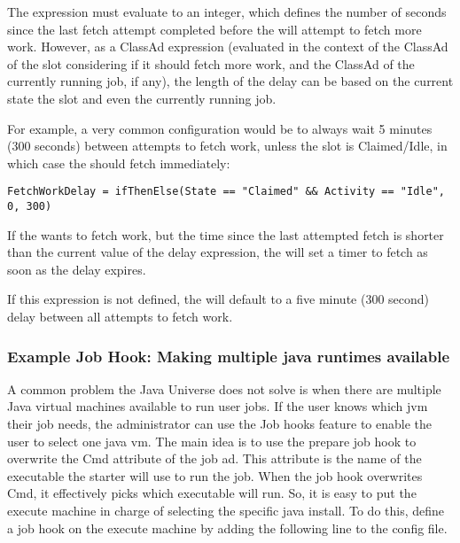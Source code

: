The  expression must evaluate to an integer,
which defines the number of seconds since the last fetch attempt
completed before the  will attempt to fetch more work.
However, as a ClassAd expression (evaluated in the context of the
ClassAd of the slot considering if it should fetch more work, and the
ClassAd of the currently running job, if any), the length of the delay
can be based on the current state the slot and even the currently
running job.

For example, a very common configuration would be to always wait 5
minutes (300 seconds) between attempts to fetch work, unless the slot
is Claimed/Idle, in which case the  should fetch
immediately:

\footnotesize
\begin{verbatim}
FetchWorkDelay = ifThenElse(State == "Claimed" && Activity == "Idle", 0, 300) 
\end{verbatim}
\normalsize

If the  wants to fetch work, but the time since the
last attempted fetch is shorter than the current value of the delay
expression, the  will set a timer to fetch as soon as
the delay expires.

If this expression is not defined, the  will default to
a five minute (300 second) delay between all attempts to fetch work.

\subsubsection{\label{sec:job-hooks-java-example}
Example Job Hook: Making multiple java runtimes available}

A common problem the Java Universe does not solve is when there
are multiple Java virtual machines available to run user jobs.  If
the user knows which jvm their job needs, the administrator can
use the Job hooks feature to enable the user to select one java vm.
The main idea is to use the prepare job hook to overwrite the
Cmd attribute of the job ad.  This attribute is the name of the
executable the starter will use to run the job.  When the job
hook overwrites Cmd, it effectively picks which executable will run.  So,
it is easy to put the execute machine in charge of selecting the specific
java install.  To do this, define a job hook on the execute machine
by adding the following line to the config file.

